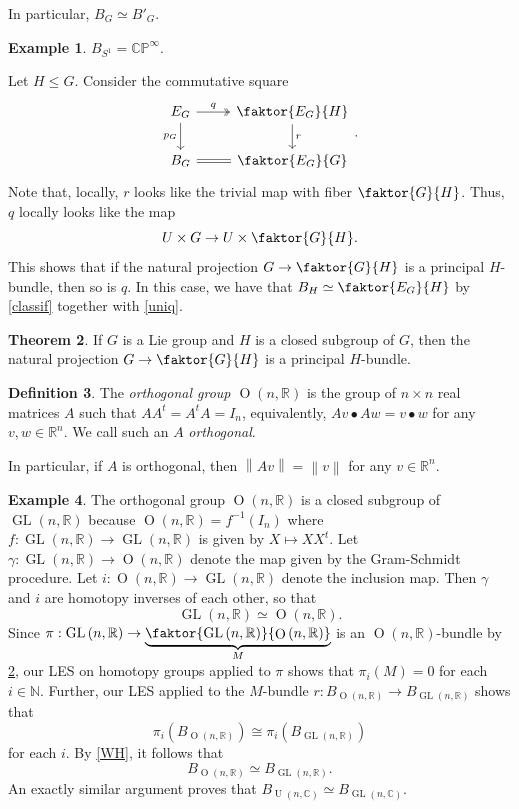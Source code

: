 \documentclass[10pt,letterpaper,cm]{nupset}
\theoremstyle{definition}
\newtheorem{defn}{Definition}[subsection]
\newtheorem{exmp}[defn]{Example}
\theoremstyle{theorem}
\newtheorem{theorem}[defn]{Theorem}
\theoremstyle{remark}
\newcommand{\C}{\mathbb C}
\newcommand{\CP}{\mathbb{CP}}
\newcommand{\N}{\mathbb N}
\newcommand{\R}{\mathbb{R}}
\newcommand{\1}{\mathbb{1}}
\newcommand{\0}{\vec 0}
\DeclareMathOperator{\GL}{GL}
\DeclareMathOperator{\Or}{O}
\DeclareMathOperator{\Un}{U}
\begin{document}
In particular, $B_G \simeq B'_G$.

\begin{exmp}\label{classcirc}
$B_{S^1} = \CP^{\infty}$.
\end{exmp}


Let $H\leq G$. Consider the commutative square
\[
\begin{tikzcd}
E_G \arrow[d, "p_G"'] \arrow[r, "q", two heads] & \faktor{E_G}{H} \arrow[d, "r"] \\
B_G \arrow[r, equals]                                   & \faktor{E_G}{G}               
\end{tikzcd}.
\]  Note that, locally, $r$ looks like the trivial map with fiber $\faktor{G}{H}$. Thus, $q$ locally looks like the map $$U \times G \to U \times \faktor{G}{H}.$$ This shows that if the natural projection $G \to \faktor{G}{H}$ is a principal $H$-bundle, then so is $q$. In this case, we have that $B_H \simeq \faktor{E_G}{H}$ by \cref{classif} together with \cref{uniq}.


\begin{theorem}\label{H-bund}
If $G$ is a Lie group and $H$ is a closed subgroup of $G$, then the natural projection $G \to \faktor{G}{H}$ is a principal $H$-bundle. 
\end{theorem}

\begin{defn}
The \textit{orthogonal group $\Or\left(n, \R\right)$} is the group of $n\times n$ real matrices $A$ such that $AA^t = A^tA = I_n$, equivalently, $Av \bullet Aw = v\bullet w$ for any $v,w\in \R^n$. We call such an $A$ \textit{orthogonal}.
\end{defn}

In particular, if $A$ is orthogonal, then $\left\lVert{Av}\right\rVert = \left\lVert{v}\right\rVert$ for any $v\in \R^n$.

\begin{exmp}
The orthogonal group $\Or\left(n, \R\right)$ is a closed subgroup of $\GL\left(n, \R\right)$ because  $\Or\left(n, \R\right)= f^{-1}\left(I_n\right)$ where $f: \GL\left(n, \R\right) \to \GL\left(n, \R\right)$ is given by $X \mapsto XX^t$. Let $\gamma : \GL\left(n, \R\right) \to \Or\left(n, \R\right)$ denote the map given by the Gram-Schmidt procedure. Let $i : \Or\left(n, \R\right) \to \GL\left(n, \R\right)$ denote the inclusion map. Then $\gamma$ and $i$ are homotopy inverses of each other, so that 
\[
\GL\left(n, \R\right) \simeq \Or\left(n, \R\right).
\]  Since $\pi : \GL\left(n, \R\right) \to \underbrace{\faktor{\GL\left(n, \R\right) }{\Or\left(n, \R\right)}}_{M}$ is an $\Or\left(n, \R\right)$-bundle by \cref{H-bund}, our LES on homotopy groups applied to $\pi$ shows that $\pi_i\left(M\right) =0$ for each $i\in \N$. Further, our LES  applied to the $M$-bundle $r: B_{\Or\left(n, \R\right)} \to B_{\GL\left(n, \R\right)}$ shows that $$\pi_i\left(B_{\Or\left(n, \R\right)}\right) \cong \pi_i\left(B_{\GL\left(n, \R\right)}\right)$$ for each $i$. By \cref{WH}, it follows that 
\[
B_{\Or\left(n, \R\right)} \simeq B_{\GL\left(n, \R\right)}
.\] An exactly similar argument proves that $B_{\Un\left(n, \C\right)} \simeq B_{\GL\left(n, \C\right)}$.
\end{exmp}
\end{document}
